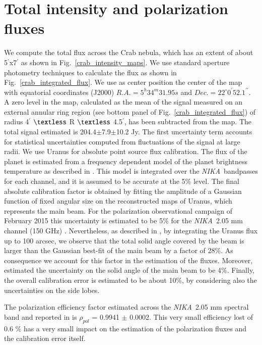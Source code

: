 \documentclass[twocolumn,traditabstract]{aa}
\def\NIKA{\textit{NIKA}}
\begin{document}
\section{Total intensity and polarization fluxes}\label{sec:Polarization estimates in CMB experiments like beams}
We compute the total flux across the Crab nebula, which has an extent of about
5$^{\prime}$x7$^{\prime}$ as shown in Fig.~\ref{crab_intensity_maps}.  We use
standard aperture photometry techniques to calculate the flux as shown in
Fig.~\ref{crab_integrated_flux}. We use as center position the center of the
map with equatorial coordinates (J2000) $R.A. = 5^h34^m31.95s$ and $Dec. = 22^{\circ}0^{\prime}52.1^{\prime\prime}$. A zero level in the map, calculated as the mean of the signal measured on
an external annular ring region (see bottom panel of
Fig.~\ref{crab_integrated_flux}) of radius 4$^\prime$ $\textless$ R $\textless$
4.5$^\prime$, has been subtracted from the map. The total signal estimated is
204.4$\pm$7.9$\pm$10.2 Jy. The first uncertainty term accounts for statistical
uncertainties computed from fluctuations of the signal at large radii.
We use Uranus for absolute point source flux calibration. The flux of the planet is estimated from a frequency dependent model of the planet brightness temperature as described in \cite{moreno2010}. 
This model is integrated over the \NIKA\ bandpasses for each channel, and it is assumed to be accurate at the 5\% level. The final absolute calibration factor is obtained by fitting the amplitude of a Gaussian function of fixed angular size on the reconstructed maps of Uranus, which represents the main beam. For the polarization observational campaign of February 2015 this uncertainty is estimated to be 5\% for the \NIKA\ 2.05 mm channel (150 GHz) \citep{ritacco2017}. 
Nevertheless, as described in \cite{adam2013, catalano2014}, by integrating the Uranus flux up to 100 arcsec, we observe that the total solid angle covered by the beam is larger than the Gaussian best-fit of the main beam by a factor of 28\%. As consequence we account for this factor in the estimation of the fluxes.
Moreover, \cite{adam2013} estimated the uncertainty on the solid angle of the main beam to be 4\%.
Finally, the overall calibration error is estimated to be about 10\%, by considering also the uncertainties on the side lobes.

The polarization efficiency factor estimated across the \NIKA\ 2.05 mm spectral band and reported in \cite{ritacco2017} is $\rho_{pol}$ = 0.9941 $\pm$ 0.0002. This very small efficiency lost of 0.6 \% has a very small impact on the estimation of the polarization fluxes and the calibration error itself. 
\end{document}
